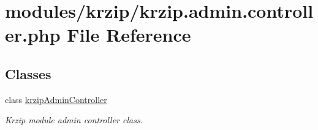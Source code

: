 \hypertarget{krzip_8admin_8controller_8php}{\section{modules/krzip/krzip.admin.\-controller.\-php File Reference}
\label{krzip_8admin_8controller_8php}
}
\subsection*{Classes}
\begin{DoxyCompactItemize}
\item 
class \hyperlink{classkrzipAdminController}{krzip\-Admin\-Controller}
\begin{DoxyCompactList}\small\item\em Krzip module admin controller class. \end{DoxyCompactList}\end{DoxyCompactItemize}
